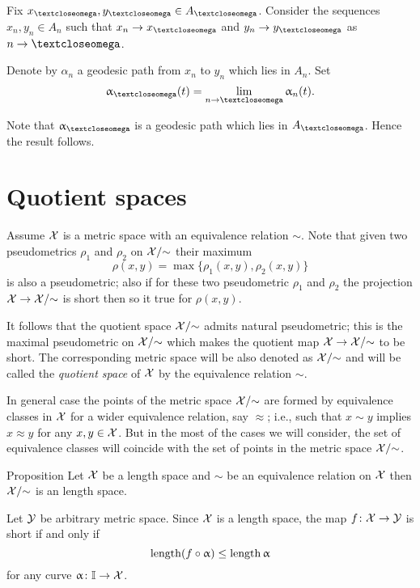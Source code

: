 Fix $x_\o,y_\o\in A_\o$.
Consider the sequences $x_n,y_n\in A_n$ such that $x_n\to x_\o$ and $y_n\to y_\o$ as $n\to\o$.

Denote by $\alpha_n$ a geodesic path from $x_n$ to $y_n$ which lies in $A_n$.
Set
\[\alpha_\o(t)=\lim_{n\to \o}\alpha_n(t).\]

Note that $\alpha_\o$ is a geodesic path which lies in $A_\o$.
Hence the result follows.
\qeds






\section{Quotient spaces}\label{sec:quotient}

 Assume $\mathcal{X}$ is a metric space
with an equivalence relation $\sim$.
Note that given two pseudometrics $\rho_1$ and $\rho_2$ on $\mathcal{X}/{\sim}$
their maximum 
\[\rho(x,y)=\max\{\rho_1(x,y),\rho_2(x,y)\}\]
is also a pseudometric;
also if for these two pseudometric $\rho_1$ and $\rho_2$ the projection $\spc{X}\to\spc{X}/{\sim}$ is short then so it true for  $\rho(x,y)$.

It follows that 
the quotient space $\mathcal{X}/{\sim}$ admits natural pseudometric;
this is the maximal pseudometric on  $\mathcal{X}/{\sim}$ 
which makes the quotient map 
$\spc{X}\to\spc{X}/{\sim}$ to be short.
The corresponding metric space will be also denoted as $\mathcal{X}/{\sim}$
and will be called the \emph{quotient space} of $\mathcal{X}$ by the equivalence relation $\sim$.

In general case the points of the metric space $\mathcal{X}/{\sim}$
are formed by equivalence classes in $\mathcal{X}$
for a wider equivalence relation, say $\approx$; 
i.e., such that $x\sim y$ implies $x\approx y$ for any $x,y\in \spc{X}$.
But in the most of the cases we will consider, 
the set of equivalence classes will coincide with the set of points in the metric space $\mathcal{X}/{\sim}$.



\begin{thm}{Proposition}\label{prop:length-X}
Let $\mathcal{X}$ be a length space and 
$\sim$ be an equivalence relation on $\mathcal{X}$ then $\mathcal{X}/{\sim}$
is an length space.
\end{thm}

Let $\mathcal{Y}$ be arbitrary metric space.
Since $\mathcal{X}$ is a length space,
the map $f\:\spc{X}\to \spc{Y}$ is short if and only if 
\[\length(f\circ\alpha)\le \length\alpha\]
for any curve
$\alpha\:\II\to \spc{X}$.

